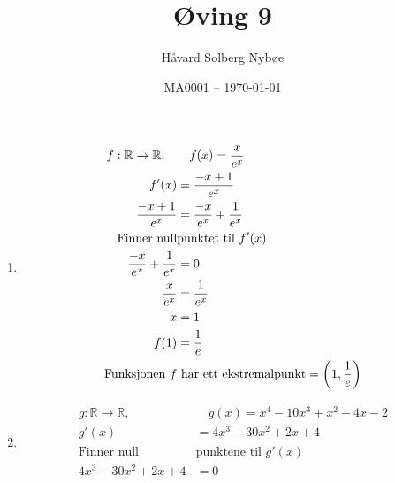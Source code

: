 \documentclass[a4paper, 12pt]{article}  %
\title{Øving 9}               %
\author{Håvard Solberg Nybøe}           %
\date{MA0001 -- \today}                    %
\begin{document}
\maketitle

\begin{enumerate}
    \item [\boxed{1}]
          \begin{align*}
              f: \mathbb{R} \rightarrow \mathbb{R}, \quad & \quad f(x) = \frac{x}{e^x}                                  \\
              f'(x)                                       & = \frac{-x+1}{e^x}                                          \\
              \frac{-x+1}{e^x}                            & = \frac{-x}{e^x} + \frac{1}{e^x}                            \\
              \text{Finner null}                          & \text{punktet til } f'(x)                                   \\
              \frac{-x}{e^x} + \frac{1}{e^x}              & = 0                                                         \\
              \frac{x}{e^x}                               & = \frac{1}{e^x}                                             \\
              x                                           & = 1                                                         \\
              f(1)                                        & = \frac{1}{e}                                               \\
              \text{Funksjonen } f                        & \text{ har ett ekstremalpunkt} = \left(1, {1\over e}\right) \\
          \end{align*}
    \item [\boxed{2}]
          \begin{align*}
              g: \mathbb{R} \rightarrow \mathbb{R}, \quad    & \quad g(x) = x^4 - 10x^3 + x^2 + 4x -2              \\
              g'(x)                                          & = 4x^3 - 30x^2 + 2x + 4                             \\
              \text{Finner null}                             & \text{punktene til } g'(x)                          \\
              4x^3 - 30x^2 + 2x + 4                          & = 0                                                 \\

\end{align*}
\end{enumerate}
\end{document}
